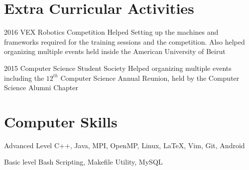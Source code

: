 \documentclass{tccv}
\begin{document}
\section{Extra Curricular Activities}
\begin{yearlist}
\item{2016}
     {VEX Robotics Competition}
     {Helped Setting up the machines and frameworks required for the training sessions and the competition. Also helped organizing multiple events held inside the American University of Beirut}


\item{2015}
     {Computer Science Student Society}
     {Helped organizing multiple events including the $12^{th}$ Computer Science Annual Reunion, held by the Computer Science Alumni Chapter}

\end{yearlist}




\section{Computer Skills}

\begin{factlist}

\item{Advanced Level}
     {C++, Java, MPI, OpenMP, Linux, \LaTeX, Vim, Git, Android}


\item{Basic level}
     {Bash Scripting, Makefile Utility, MySQL}

\end{factlist}
\end{document}
